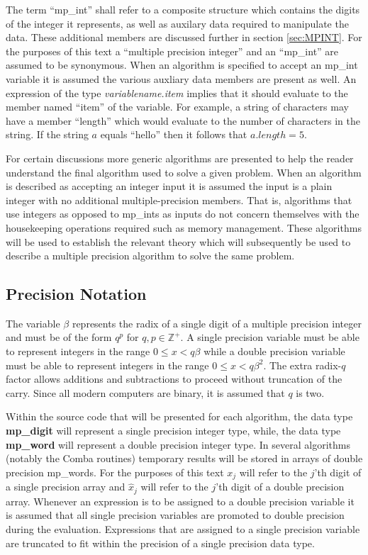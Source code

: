 \documentclass[b5paper]{book}
\def\Z{{\mathbb Z}}
\begin{document}
The term ``mp\_int'' shall refer to a composite structure which contains the digits of the integer it represents, as well 
as auxilary data required to manipulate the data.  These additional members are discussed further in section 
\ref{sec:MPINT}.  For the purposes of this text a ``multiple precision integer'' and an ``mp\_int'' are assumed to be 
synonymous.  When an algorithm is specified to accept an mp\_int variable it is assumed the various auxliary data members 
are present as well.  An expression of the type \textit{variablename.item} implies that it should evaluate to the 
member named ``item'' of the variable.  For example, a string of characters may have a member ``length'' which would 
evaluate to the number of characters in the string.  If the string $a$ equals ``hello'' then it follows that 
$a.length = 5$.  

For certain discussions more generic algorithms are presented to help the reader understand the final algorithm used
to solve a given problem.  When an algorithm is described as accepting an integer input it is assumed the input is 
a plain integer with no additional multiple-precision members.  That is, algorithms that use integers as opposed to 
mp\_ints as inputs do not concern themselves with the housekeeping operations required such as memory management.  These 
algorithms will be used to establish the relevant theory which will subsequently be used to describe a multiple
precision algorithm to solve the same problem.  

\subsection{Precision Notation}
The variable $\beta$ represents the radix of a single digit of a multiple precision integer and 
must be of the form $q^p$ for $q, p \in \Z^+$.  A single precision variable must be able to represent integers in 
the range $0 \le x < q \beta$ while a double precision variable must be able to represent integers in the range 
$0 \le x < q \beta^2$.  The extra radix-$q$ factor allows additions and subtractions to proceed without truncation of the 
carry.  Since all modern computers are binary, it is assumed that $q$ is two.

 
Within the source code that will be presented for each algorithm, the data type \textbf{mp\_digit} will represent 
a single precision integer type, while, the data type \textbf{mp\_word} will represent a double precision integer type.  In 
several algorithms (notably the Comba routines) temporary results will be stored in arrays of double precision mp\_words.  
For the purposes of this text $x_j$ will refer to the $j$'th digit of a single precision array and $\hat x_j$ will refer to 
the $j$'th digit of a double precision array.  Whenever an expression is to be assigned to a double precision
variable it is assumed that all single precision variables are promoted to double precision during the evaluation.  
Expressions that are assigned to a single precision variable are truncated to fit within the precision of a single
precision data type.
\end{document}
